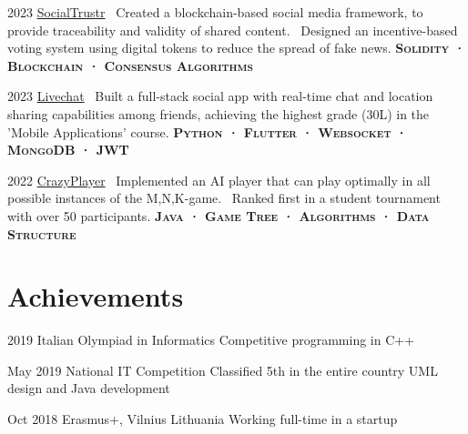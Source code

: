 \documentclass{tccv}
\begin{document}
\begin{yearlist}

\item{2023}
     {\href{https://github.com/manuelarto/socialtrustr}{SocialTrustr}}
     {\textbullet~Created a blockchain-based social media framework, to provide traceability and validity of shared content. \newline
     \textbullet~Designed an incentive-based voting system using digital tokens to reduce the spread of fake news. \newline
     \textbf{\textsc{Solidity · Blockchain · Consensus Algorithms}}}
\item{2023}
     {\href{https://github.com/manuelarto/livechat}{Livechat}}
     {\textbullet~Built a full-stack social app with real-time chat and location sharing capabilities among friends, achieving the highest grade (30L) in the 'Mobile Applications' course. \newline
    \textbf{\textsc{Python · Flutter · Websocket · MongoDB · JWT}}}
\item{2022}
     {\href{https://github.com/manuelarto/crazyplayer}{CrazyPlayer}}
     {\textbullet~Implemented an AI player that can play optimally in all possible instances of the M,N,K-game. \newline
     \textbullet~Ranked first in a student tournament with over 50 participants. \newline
    \textbf{\textsc{Java · Game Tree · Algorithms · Data Structure}}}

\end{yearlist}


\section{Achievements}

\begin{yearlist}

\item[]{2019}
     {Italian Olympiad in Informatics}
     {Competitive programming in C++}

\item[]{May 2019}
     {National IT Competition}
     {Classified 5th in the entire country \newline
     UML design and Java development}

\item[]{Oct 2018}
     {Erasmus+, Vilnius Lithuania}
     {Working full-time in a startup}

\end{yearlist}
\end{document}
